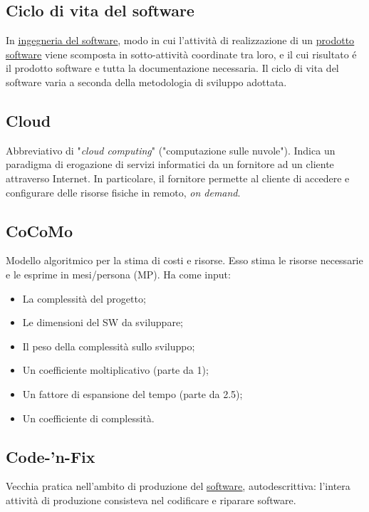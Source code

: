 	\subsection{Ciclo di vita del software}
	\label{sec:ciclodivita}
	In \underline{\hyperref[sec:swe]{ingegneria del software}}, modo in cui l'attività di realizzazione di un \underline{\hyperref[sec:prodottosoftware]{prodotto software}} viene scomposta in sotto-attività coordinate tra loro, e il cui risultato é il prodotto software e tutta la documentazione necessaria. Il ciclo di vita del software varia a seconda della metodologia di sviluppo adottata.


	
	\subsection{Cloud}
	\label{sec:cloud}
	Abbreviativo di "\emph{cloud computing}" ("computazione sulle nuvole"). Indica un paradigma di erogazione di servizi informatici da un fornitore ad un cliente attraverso Internet. In particolare, il fornitore permette al cliente di accedere e configurare delle risorse fisiche in remoto, \emph{on demand}.

	
	\subsection{CoCoMo}
	\label{sec:cocomo}
	Modello algoritmico per la stima di costi e risorse. Esso stima le risorse necessarie e le esprime in mesi/persona (MP). Ha come input:
	\begin{itemize}
	\item La complessità del progetto;
	\item Le dimensioni del SW da sviluppare;
	\item Il peso della complessità sullo sviluppo;
	\item Un coefficiente moltiplicativo (parte da 1);
	\item Un fattore di espansione del tempo (parte da 2.5);
	\item Un coefficiente di complessità.
	\end{itemize}

	
	\subsection{Code-'n-Fix}
	\label{sec:codenfix}
	Vecchia pratica nell'ambito di produzione del \underline{\hyperref[sec:prodottosoftware]{software}}, autodescrittiva: l'intera attività di produzione consisteva nel codificare e riparare software.


